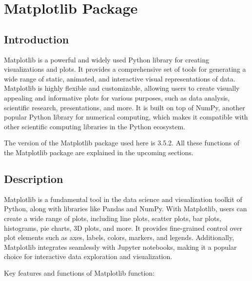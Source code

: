 %
%




\chapter{Matplotlib Package}


\section{Introduction}

Matplotlib is a powerful and widely used Python library for creating visualizations and plots. It provides a comprehensive set of tools for generating a wide range of static, animated, and interactive visual representations of data. Matplotlib is highly flexible and customizable, allowing users to create visually appealing and informative plots for various purposes, such as data analysis, scientific research, presentations, and more. It is built on top of NumPy, another popular Python library for numerical computing, which makes it compatible with other scientific computing libraries in the Python ecosystem.

The version of the Matplotlib package used here is 3.5.2.  All these functions of the Matplotlib package are explained in the upcoming sections.

\section{Description}

Matplotlib is a fundamental tool in the data science and visualization toolkit of Python, along with libraries like Pandas and NumPy. With Matplotlib, users can create a wide range of plots, including line plots, scatter plots, bar plots, histograms, pie charts, 3D plots, and more. It provides fine-grained control over plot elements such as axes, labels, colors, markers, and legends. Additionally, Matplotlib integrates seamlessly with Jupyter notebooks, making it a popular choice for interactive data exploration and visualization.

Key features and functions of Matplotlib function:

